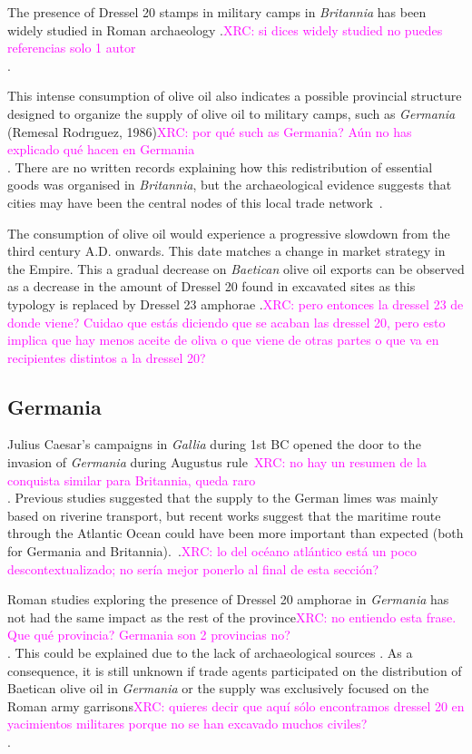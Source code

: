 \documentclass[review]{elsarticle}
\newcommand{\memo}[2]{\textcolor{#1}{#2}}
\newcommand{\xavi}[1]{\memo{magenta}{XRC: #1\\}}
\begin{document}
The presence of Dressel 20 stamps in military camps in \textit{Britannia} has been widely studied in Roman archaeology \citep{carreras_britannia_1998}.\xavi{si dices widely studied no puedes referencias solo 1 autor}. 


This intense consumption of olive oil also indicates a possible provincial structure designed to organize the supply of olive oil to military camps, such as \textit{Germania} (Remesal Rodrıguez, 1986)\xavi{por qué such as Germania? Aún no has explicado qué hacen en Germania}. There are no written records explaining how this redistribution of essential goods was organised in \textit{Britannia}, but the archaeological evidence suggests that cities may have been the central nodes of this local trade network~\citep[45]{funari_economic_2005}.

The consumption of olive oil would experience a progressive slowdown from the third century A.D. onwards. This date matches a change in market strategy in the Empire. This a gradual decrease on \textit{Baetican} olive oil exports can be observed as a decrease in the amount of Dressel 20 found in excavated sites as this typology is replaced by Dressel 23 amphorae \citep{rodriguez1991aceite,millet_anforas_1998}.\xavi{pero entonces la dressel 23 de donde viene? Cuidao que estás diciendo que se acaban las dressel 20, pero esto implica que hay menos aceite de oliva o que viene de otras partes o que va en recipientes distintos a la dressel 20?}

\subsection{Germania}

Julius Caesar's campaigns in \textit{Gallia} during 1st BC opened the door to the invasion of \textit{Germania} during Augustus rule~\citep{remesal_annona_1986,remesal_baetica_2002}\xavi{no hay un resumen de la conquista similar para Britannia, queda raro}. Previous studies suggested that the supply to the German limes was mainly based on riverine transport, but recent works suggest that the maritime route through the Atlantic Ocean could have been more important than expected (both for Germania and Britannia).~\citep{remesal_germn_2010,rubio-campillo_ecology_2018}.\xavi{lo del océano atlántico está un poco descontextualizado; no sería mejor ponerlo al final de esta sección?}

Roman studies exploring the presence of Dressel 20 amphorae in \textit{Germania} has not had the same impact as the rest of the province\xavi{no entiendo esta frase. Que qué provincia? Germania son 2 provincias no?}. This could be explained due to the lack of archaeological sources \citep{horacio2010llegada}. As a consequence, it is still unknown if trade agents participated on the distribution of Baetican olive oil in \textit{Germania} or the supply was exclusively focused on the Roman army garrisons\citep[156]{remesal_germn_2010}\xavi{quieres decir que aquí sólo encontramos dressel 20 en yacimientos militares porque no se han excavado muchos civiles?}. 
\end{document}
